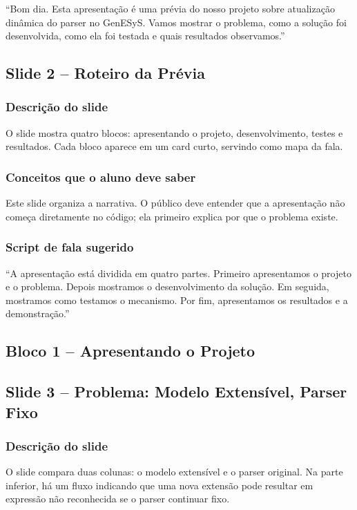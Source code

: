 \documentclass[12pt,a4paper]{article}
\newcommand{\slide}[2]{\subsection{Slide #1 -- #2}}
\begin{document}
``Bom dia. Esta apresenta\c{c}\~ao \'e uma pr\'evia do nosso projeto sobre atualiza\c{c}\~ao din\^amica do parser no GenESyS. Vamos mostrar o problema, como a solu\c{c}\~ao foi desenvolvida, como ela foi testada e quais resultados observamos.''

\slide{2}{Roteiro da Pr\'evia}

\subsubsection*{Descri\c{c}\~ao do slide}

O slide mostra quatro blocos: apresentando o projeto, desenvolvimento, testes e resultados. Cada bloco aparece em um card curto, servindo como mapa da fala.

\subsubsection*{Conceitos que o aluno deve saber}

Este slide organiza a narrativa. O p\'ublico deve entender que a apresenta\c{c}\~ao n\~ao come\c{c}a diretamente no c\'odigo; ela primeiro explica por que o problema existe.

\subsubsection*{Script de fala sugerido}

``A apresenta\c{c}\~ao est\'a dividida em quatro partes. Primeiro apresentamos o projeto e o problema. Depois mostramos o desenvolvimento da solu\c{c}\~ao. Em seguida, mostramos como testamos o mecanismo. Por fim, apresentamos os resultados e a demonstra\c{c}\~ao.''

\subsection*{Bloco 1 -- Apresentando o Projeto}

\slide{3}{Problema: Modelo Extens\'ivel, Parser Fixo}

\subsubsection*{Descri\c{c}\~ao do slide}

O slide compara duas colunas: o modelo extens\'ivel e o parser original. Na parte inferior, h\'a um fluxo indicando que uma nova extens\~ao pode resultar em express\~ao n\~ao reconhecida se o parser continuar fixo.
\end{document}
